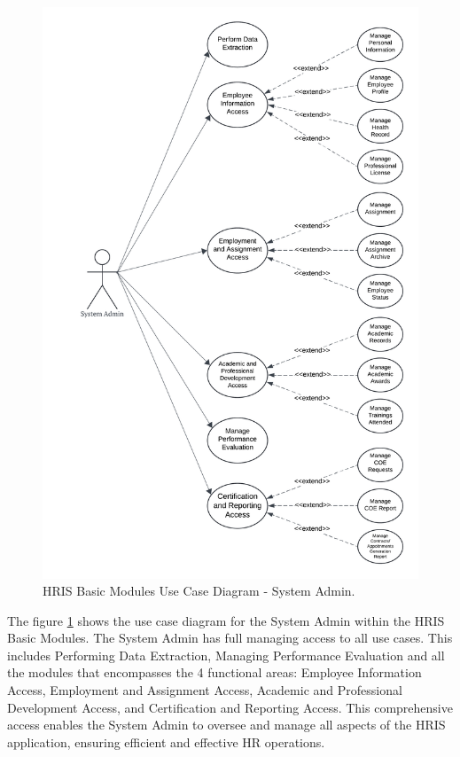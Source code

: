     \begin{figure}[H]
        \centering
        \includegraphics[width=0.9\linewidth]{figures/images/diagrams/usecase/use-case-basic-1.png}
        \caption{HRIS Basic Modules Use Case Diagram - System Admin.}
        \label{fig:use-case-basic-1}
    \end{figure}

    The figure \ref{fig:use-case-basic-1} shows the use case diagram for the System Admin within the HRIS Basic Modules. The System Admin has full managing access to all use cases. This includes Performing Data Extraction, Managing Performance Evaluation and all the modules that encompasses the 4 functional areas: Employee Information Access, Employment and Assignment Access, Academic and Professional Development Access, and Certification and Reporting Access. This comprehensive access enables the System Admin to oversee and manage all aspects of the HRIS application, ensuring efficient and effective HR operations.

